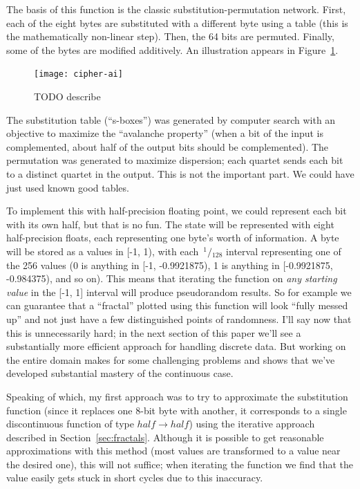 \documentclass[twocolumn]{article}
\newcommand\sfrac[2]{\!{}\,^{#1}\!/{}\!_{#2}}
\begin{document}
The basis of this function is the classic substitution-permutation
network. First, each of the eight bytes are substituted with a
different byte using a table (this is the mathematically non-linear
step). Then, the 64 bits are permuted. Finally, some of the bytes are
modified additively. An illustration appears in Figure~\ref{fig:cipher}.

\begin{figure}
\texttt{[image: cipher-ai]}
\caption{ TODO describe } \label{fig:cipher}
\end{figure}

The substitution table (``s-boxes'') was generated by computer search
with an objective to maximize the ``avalanche property'' (when a bit
of the input is complemented, about half of the output bits should be
complemented). The permutation was generated to maximize dispersion;
each quartet sends each bit to a distinct quartet in the output. This
is not the important part. We could have just used known good tables.

To implement this with half-precision floating point, we could
represent each bit with its own half, but that is no fun. The state
will be represented with eight half-precision floats, each
representing one byte's worth of information. A byte will be stored as
a values in [-1, 1), with each $\sfrac{1}{128}$ interval representing
one of the 256 values (0 is anything in [-1, -0.9921875), 1 is
anything in [-0.9921875, -0.984375), and so on). This means that
iterating the function on {\em any starting value} in the [-1, 1]
interval will produce pseudorandom results. So for example
we can guarantee that a ``fractal'' plotted using this function
will look ``fully messed up'' and not just have a few
distinguished points of randomness.
I'll say now that this is unnecessarily hard; in the next
section of this paper we'll see a substantially more efficient
approach for handling discrete data. But working on the entire domain
makes for some challenging problems and shows that we've developed
substantial mastery of the continuous case.

Speaking of which, my first approach was to try to approximate the
substitution function (since it replaces one 8-bit byte with another,
it corresponds to a single discontinuous function of type $half
\rightarrow half$) using the iterative approach described in
Section~\ref{sec:fractals}. Although it is possible to get reasonable
approximations with this method (most values are transformed to a
value near the desired one), this will not suffice; when iterating the
function we find that the value easily gets stuck in short cycles due
to this inaccuracy.
\end{document}
